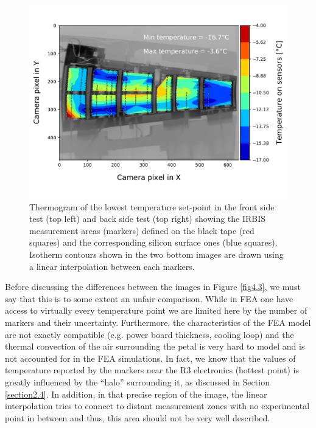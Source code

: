 \begin{figure}[ht!]
			\includegraphics[scale=0.39]{Figures/Chapter04/thermogram_markers_9_201711271006.pdf}
			\caption{Thermogram of the lowest temperature set-point in the front side test (top left) and back side test (top right) showing the IRBIS measurement areas (markers) defined on the black tape (red squares) and the corresponding silicon surface ones (blue squares). Isotherm contours shown in the two bottom images are drawn using a linear interpolation between each markers.}\label{fig4.2}
		\end{figure}
		
		Before discussing the differences between the images in Figure \ref{fig4.3}, we must say that this is to some extent an unfair comparison. While in FEA one have access to virtually every temperature point we are limited here by the number of markers and their uncertainty. Furthermore, the characteristics of the FEA model are not exactly compatible (e.g. power board thickness, cooling loop) and the thermal convection of the air surrounding the petal is very hard to model and is not accounted for in the FEA simulations. In fact, we know that the values of temperature reported by the markers near the R3 electronics (hottest point) is greatly influenced by the “halo” surrounding it, as discussed in Section \ref{section2.4}. In addition, in that precise region of the image, the linear interpolation tries to connect to distant measurement zones with no experimental point in between and thus, this area should not be very well described.
		

